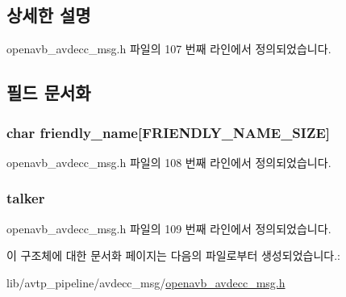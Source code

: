 \subsection{상세한 설명}


openavb\+\_\+avdecc\+\_\+msg.\+h 파일의 107 번째 라인에서 정의되었습니다.



\subsection{필드 문서화}
\subsubsection[{\texorpdfstring{friendly\+\_\+name}{friendly_name}}]{\setlength{\rightskip}{0pt plus 5cm}char friendly\+\_\+name\mbox{[}{\bf F\+R\+I\+E\+N\+D\+L\+Y\+\_\+\+N\+A\+M\+E\+\_\+\+S\+I\+ZE}\mbox{]}}\hypertarget{structopenavb_avdecc_msg_params___client_init_identify__t_a25c82ac188182d72242fb10f0285a2bd}{}\label{structopenavb_avdecc_msg_params___client_init_identify__t_a25c82ac188182d72242fb10f0285a2bd}


openavb\+\_\+avdecc\+\_\+msg.\+h 파일의 108 번째 라인에서 정의되었습니다.

\subsubsection[{\texorpdfstring{talker}{talker}}]{ talker}\hypertarget{structopenavb_avdecc_msg_params___client_init_identify__t_a9ce269c206dfe8d01ff1711003b5c1b8}{}\label{structopenavb_avdecc_msg_params___client_init_identify__t_a9ce269c206dfe8d01ff1711003b5c1b8}


openavb\+\_\+avdecc\+\_\+msg.\+h 파일의 109 번째 라인에서 정의되었습니다.



이 구조체에 대한 문서화 페이지는 다음의 파일로부터 생성되었습니다.\+:\begin{DoxyCompactItemize}
\item 
lib/avtp\+\_\+pipeline/avdecc\+\_\+msg/\hyperlink{openavb__avdecc__msg_8h}{openavb\+\_\+avdecc\+\_\+msg.\+h}\end{DoxyCompactItemize}
